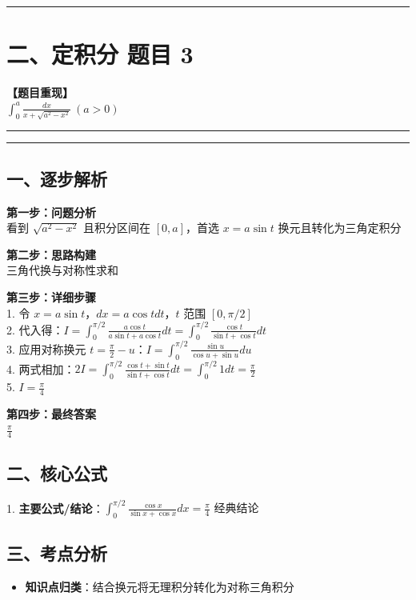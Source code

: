 ﻿\documentclass[12pt, a4paper]{ctexart}
\newcommand{\TopSeparator}{
    \par\noindent\rule{\textwidth}{1.5pt}\vspace{0.5em}
}
\newcommand{\AnalysisSeparator}{
    \par\noindent\rule{\textwidth}{0.5pt}\vspace{0.2em}\hrule\vspace{0.5em}
}
\newenvironment{RedAnalysis}{
    \par
    \color{red} 
}{
    \par
    \color{black} 
}
\begin{document}
\vspace{2em}

\TopSeparator
\section*{二、定积分 题目 3}

\textbf{【题目重现】} \\
$\int_{0}^{a} \frac{dx}{x+\sqrt{a^2-x^2}} \ (a>0)$

\AnalysisSeparator

\begin{RedAnalysis}

	\subsection*{一、逐步解析}

	\textbf{第一步：问题分析} \\
	看到 $\sqrt{a^2-x^2}$ 且积分区间在 $[0, a]$，首选 $x = a\sin t$ 换元且转化为三角定积分

	\textbf{第二步：思路构建} \\
	三角代换与对称性求和

	\textbf{第三步：详细步骤} \\
	1. 令 $x = a\sin t$，$dx = a\cos t dt$，$t$ 范围 $[0, \pi/2]$ \\ 
	2. 代入得：$I = \int_{0}^{\pi/2} \frac{a\cos t}{a\sin t + a\cos t} dt = \int_{0}^{\pi/2} \frac{\cos t}{\sin t + \cos t} dt$ \\ 
	3. 应用对称换元 $t = \frac{\pi}{2} - u$：$I = \int_{0}^{\pi/2} \frac{\sin u}{\cos u + \sin u} du$ \\ 
	4. 两式相加：$2I = \int_0^{\pi/2} \frac{\cos t + \sin t}{\sin t + \cos t} dt = \int_0^{\pi/2} 1 dt = \frac{\pi}{2}$ \\ 
	5. $I = \frac{\pi}{4}$

	\textbf{第四步：最终答案} \\
	$\frac{\pi}{4}$

	\subsection*{二、核心公式}
	1. \textbf{主要公式/结论}：$\int_0^{\pi/2} \frac{\cos x}{\sin x + \cos x} dx = \frac{\pi}{4} \text{ 经典结论}$

	\subsection*{三、考点分析}
	\begin{itemize}
		\item \textbf{知识点归类}：结合换元将无理积分转化为对称三角积分
	\end{itemize}

\end{RedAnalysis}
\end{document}
